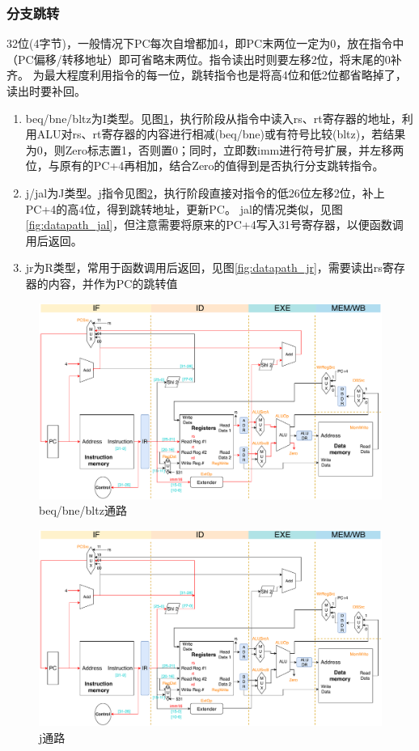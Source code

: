 \subsubsection{分支跳转}
32位(4字节)，一般情况下PC每次自增都加4，即PC末两位一定为0，放在指令中（PC偏移/转移地址）即可省略末两位。指令读出时则要左移2位，将末尾的0补齐。
为最大程度利用指令的每一位，跳转指令也是将高4位和低2位都省略掉了，读出时要补回。
\begin{enumerate}
	\item beq/bne/bltz为I类型。见图\ref{fig:datapath_beq}，执行阶段从指令中读入rs、rt寄存器的地址，利用ALU对rs、rt寄存器的内容进行相减(beq/bne)或有符号比较(bltz)，若结果为0，则Zero标志置1，否则置0；同时，立即数imm进行符号扩展，并左移两位，与原有的PC+4再相加，结合Zero的值得到是否执行分支跳转指令。
	\item j/jal为J类型。j指令见图\ref{fig:datapath_j}，执行阶段直接对指令的低26位左移2位，补上PC+4的高4位，得到跳转地址，更新PC。
	jal的情况类似，见图\ref{fig:datapath_jal}，但注意需要将原来的PC+4写入31号寄存器，以便函数调用后返回。
	\item jr为R类型，常用于函数调用后返回，见图\ref{fig:datapath_jr}，需要读出rs寄存器的内容，并作为PC的跳转值
\end{enumerate}
\begin{figure}[H]
\centering
\includegraphics[width=\linewidth]{fig/Datapath-beq.pdf}
\caption{beq/bne/bltz通路}
\label{fig:datapath_beq}
\end{figure}
\begin{figure}[H]
\centering
\includegraphics[width=\linewidth]{fig/Datapath-j.pdf}
\caption{j通路}
\label{fig:datapath_j}
\end{figure}
